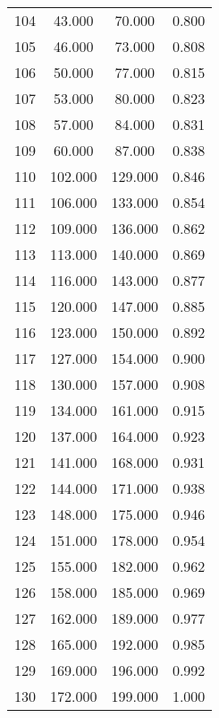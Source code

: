 \begin{tabular}{cccc}
  104 & 43.000 & 70.000 & 0.800 \\ 
  105 & 46.000 & 73.000 & 0.808 \\ 
  106 & 50.000 & 77.000 & 0.815 \\ 
  107 & 53.000 & 80.000 & 0.823 \\ 
  108 & 57.000 & 84.000 & 0.831 \\ 
  109 & 60.000 & 87.000 & 0.838 \\ 
  110 & 102.000 & 129.000 & 0.846 \\ 
  111 & 106.000 & 133.000 & 0.854 \\ 
  112 & 109.000 & 136.000 & 0.862 \\ 
  113 & 113.000 & 140.000 & 0.869 \\ 
  114 & 116.000 & 143.000 & 0.877 \\ 
  115 & 120.000 & 147.000 & 0.885 \\ 
  116 & 123.000 & 150.000 & 0.892 \\ 
  117 & 127.000 & 154.000 & 0.900 \\ 
  118 & 130.000 & 157.000 & 0.908 \\ 
  119 & 134.000 & 161.000 & 0.915 \\ 
  120 & 137.000 & 164.000 & 0.923 \\ 
  121 & 141.000 & 168.000 & 0.931 \\ 
  122 & 144.000 & 171.000 & 0.938 \\ 
  123 & 148.000 & 175.000 & 0.946 \\ 
  124 & 151.000 & 178.000 & 0.954 \\ 
  125 & 155.000 & 182.000 & 0.962 \\ 
  126 & 158.000 & 185.000 & 0.969 \\ 
  127 & 162.000 & 189.000 & 0.977 \\ 
  128 & 165.000 & 192.000 & 0.985 \\ 
  129 & 169.000 & 196.000 & 0.992 \\ 
  130 & 172.000 & 199.000 & 1.000 \\ 
   \hline
\end{tabular}

